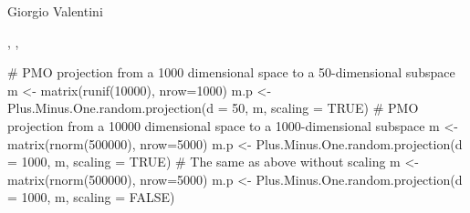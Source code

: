 \documentclass{article}
\begin{document}
\begin{Author}\relax
Giorgio Valentini 
\end{Author}
\begin{SeeAlso}\relax
{}, ,
\end{SeeAlso}
\begin{Examples}
\begin{ExampleCode}
# PMO projection from a 1000 dimensional space to a 50-dimensional subspace
m <- matrix(runif(10000), nrow=1000)
m.p <- Plus.Minus.One.random.projection(d = 50, m, scaling = TRUE)
# PMO projection from a 10000 dimensional space to a 1000-dimensional subspace
m <- matrix(rnorm(500000), nrow=5000)
m.p <- Plus.Minus.One.random.projection(d = 1000, m, scaling = TRUE)
# The same as above without scaling
m <- matrix(rnorm(500000), nrow=5000)
m.p <- Plus.Minus.One.random.projection(d = 1000, m, scaling = FALSE)
\end{ExampleCode}
\end{Examples}
\end{document}
